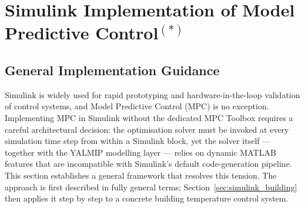 

\chapter{Simulink Implementation of Model Predictive Control\texorpdfstring{$^{(*)}$}{(*)}}
\label{chap:simulink_mpc}

\section{General Implementation Guidance}
\label{sec:simulink_general}

Simulink is widely used for rapid prototyping and hardware-in-the-loop
validation of control systems, and Model Predictive Control (MPC) is no
exception.  Implementing MPC in Simulink without the dedicated MPC
Toolbox requires a careful architectural decision: the optimisation
solver must be invoked at every simulation time step from within a
Simulink block, yet the solver itself — together with the YALMIP
modelling layer — relies on dynamic MATLAB features that are
incompatible with Simulink's default code-generation pipeline.  This
section establishes a general framework that resolves this tension.  The
approach is first described in fully general terms; Section~\ref{sec:simulink_building}
then applies it step by step to a concrete building temperature control
system.

